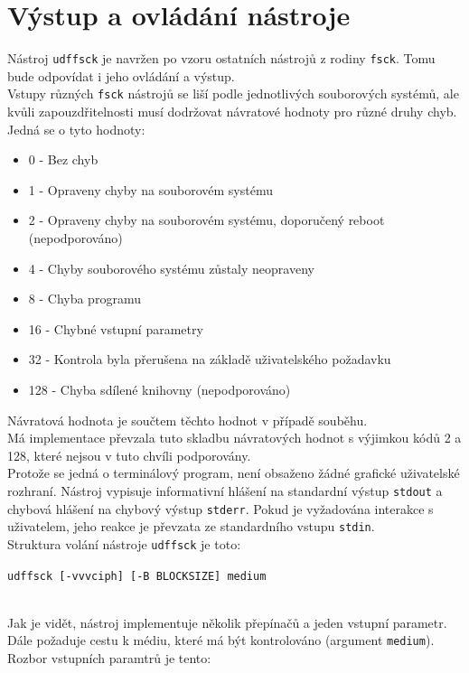 \section{Výstup a ovládání nástroje}
Nástroj \texttt{udffsck} je navržen po vzoru ostatních nástrojů z rodiny \texttt{fsck}. Tomu bude odpovídat i jeho ovládání a výstup.\\
Vstupy různých \texttt{fsck} nástrojů se liší podle jednotlivých souborových systémů, ale kvůli zapouzdřitelnosti musí dodržovat návratové hodnoty pro různé druhy chyb. Jedná se o tyto hodnoty:
\begin{itemize}
    \item 0 - Bez chyb 
    \item 1 - Opraveny chyby na souborovém systému
    \item 2 - Opraveny chyby na souborovém systému, doporučený reboot (nepodporováno) 
    \item 4 - Chyby souborového systému zůstaly neopraveny
    \item 8 - Chyba programu
    \item 16 - Chybné vstupní parametry
    \item 32 - Kontrola byla přerušena na základě uživatelského požadavku
    \item 128 - Chyba sdílené knihovny (nepodporováno)
\end{itemize}
Návratová hodnota je součtem těchto hodnot v případě souběhu.\\
Má implementace převzala tuto skladbu návratových hodnot s výjimkou kódů 2 a 128, které nejsou v tuto chvíli podporovány.\\
Protože se jedná o terminálový program, není obsaženo žádné grafické uživatelské rozhraní. Nástroj vypisuje informativní hlášení na standardní výstup \texttt{stdout} a chybová hlášení na chybový výstup \texttt{stderr}. Pokud je vyžadována interakce s uživatelem, jeho reakce je převzata ze standardního vstupu \texttt{stdin}.\\
Struktura volání nástroje \texttt{udffsck} je toto:\\
\centerline{\texttt{udffsck [-vvvciph] [-B BLOCKSIZE] medium}}\\
Jak je vidět, nástroj implementuje několik přepínačů a jeden vstupní parametr. Dále požaduje cestu k médiu, které má být kontrolováno (argument  \texttt{medium}). 
Rozbor vstupních paramtrů je tento:
